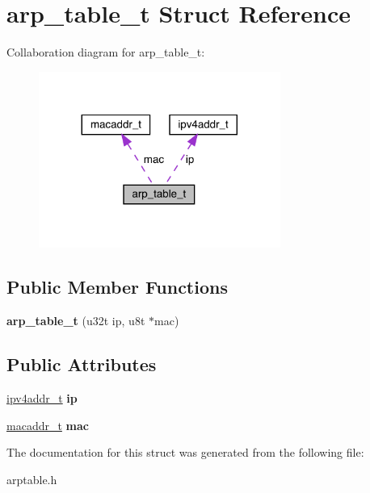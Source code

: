 \hypertarget{structarp__table__t}{}\section{arp\+\_\+table\+\_\+t Struct Reference}
\label{structarp__table__t}


Collaboration diagram for arp\+\_\+table\+\_\+t\+:\nopagebreak
\begin{figure}[H]
\begin{center}
\leavevmode
\includegraphics[width=224pt]{structarp__table__t__coll__graph}
\end{center}
\end{figure}
\subsection*{Public Member Functions}
\begin{DoxyCompactItemize}
\item 
\mbox{\label{structarp__table__t_a55dbe4612e966b60efa8324e185922dc}} 
{\bfseries arp\+\_\+table\+\_\+t} (u32t ip, u8t $\ast$mac)
\end{DoxyCompactItemize}
\subsection*{Public Attributes}
\begin{DoxyCompactItemize}
\item 
\mbox{\label{structarp__table__t_ac52ee8bea2f590d4bc914c63a308e41e}} 
\mbox{\hyperlink{unionipv4addr__t}{ipv4addr\+\_\+t}} {\bfseries ip}
\item 
\mbox{\label{structarp__table__t_aa43555ba4be02b3ce8ff25269ef346f0}} 
\mbox{\hyperlink{structmacaddr__t}{macaddr\+\_\+t}} {\bfseries mac}
\end{DoxyCompactItemize}


The documentation for this struct was generated from the following file\+:\begin{DoxyCompactItemize}
\item 
arptable.\+h\end{DoxyCompactItemize}

